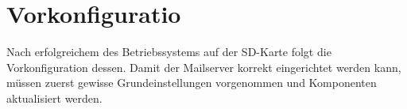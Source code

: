 \section{Vorkonfiguratio}
Nach erfolgreichem des Betriebssystems auf der SD-Karte folgt die Vorkonfiguration dessen. Damit der Mailserver korrekt eingerichtet werden kann, müssen zuerst gewisse Grundeinstellungen vorgenommen und Komponenten aktualisiert werden.

 
